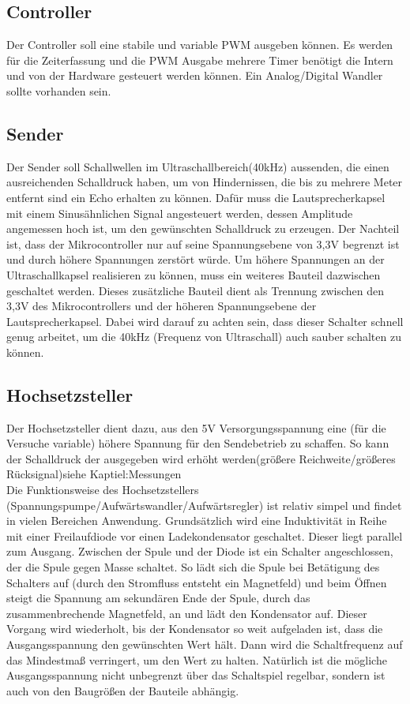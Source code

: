 \subsection{Controller}
Der Controller soll eine stabile und variable PWM ausgeben können. Es werden für die Zeiterfassung und die PWM Ausgabe mehrere Timer benötigt die Intern und von der Hardware gesteuert werden können. Ein Analog/Digital Wandler sollte vorhanden sein.

\subsection{Sender}
Der Sender soll Schallwellen im Ultraschallbereich(40kHz) aussenden, die einen ausreichenden Schalldruck haben, um von Hindernissen, die bis zu mehrere Meter entfernt sind ein Echo erhalten zu können.
Dafür muss die Lautsprecherkapsel mit einem Sinusähnlichen Signal angesteuert werden, dessen Amplitude angemessen hoch ist, um den gewünschten Schalldruck zu erzeugen. Der Nachteil ist, dass der Mikrocontroller nur auf seine Spannungsebene von 3,3V begrenzt ist und durch höhere Spannungen zerstört würde.
Um höhere Spannungen an der Ultraschallkapsel realisieren zu können, muss ein weiteres Bauteil dazwischen geschaltet werden. Dieses zusätzliche Bauteil dient als Trennung zwischen den 3,3V des Mikrocontrollers und der höheren Spannungsebene der Lautsprecherkapsel. Dabei wird darauf zu achten sein, dass dieser Schalter schnell genug arbeitet, um die 40kHz (Frequenz von Ultraschall) auch sauber schalten zu können.

\subsection{Hochsetzsteller}
Der Hochsetzsteller dient dazu, aus den 5V Versorgungsspannung eine (für die Versuche variable) höhere Spannung für den Sendebetrieb zu schaffen. So kann der Schalldruck der ausgegeben wird erhöht werden(größere Reichweite/größeres Rücksignal)siehe Kaptiel:Messungen\\%
Die Funktionsweise des Hochsetzstellers (Spannungspumpe/Aufwärtswandler/Aufwärtsregler) ist relativ simpel und findet in vielen Bereichen Anwendung. Grundsätzlich wird eine Induktivität in Reihe mit einer Freilaufdiode vor einen Ladekondensator geschaltet. Dieser liegt parallel zum Ausgang. Zwischen der Spule und der Diode ist ein Schalter angeschlossen, der die Spule gegen Masse schaltet. So lädt sich die Spule bei Betätigung des Schalters auf (durch den Stromfluss entsteht ein Magnetfeld) und beim Öffnen steigt die Spannung am sekundären Ende der Spule, durch das zusammenbrechende Magnetfeld, an und lädt den Kondensator auf. Dieser Vorgang wird wiederholt, bis der Kondensator so weit aufgeladen ist, dass die Ausgangsspannung den gewünschten Wert hält. Dann wird die Schaltfrequenz auf das Mindestmaß verringert, um den Wert zu halten. Natürlich ist die mögliche Ausgangsspannung nicht unbegrenzt über das Schaltspiel regelbar, sondern ist auch von den Baugrößen der Bauteile abhängig. 

